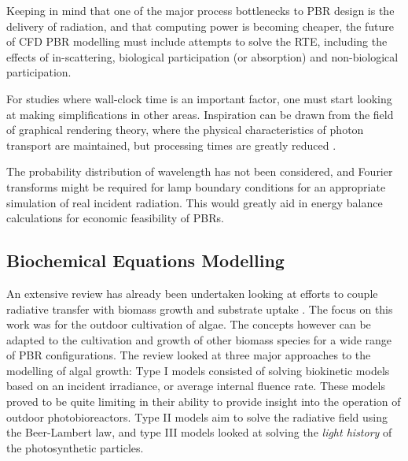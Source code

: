 Keeping in mind that one of the major process bottlenecks to PBR design is the delivery of radiation, and that computing power is becoming cheaper, the future of CFD PBR modelling must include attempts to solve the RTE, including the effects of in-scattering, biological participation (or absorption) and non-biological participation. 
\skippingparagraph

For studies where wall-clock time is an important factor, one must start looking at making simplifications in other areas. Inspiration can be drawn from the field of graphical rendering theory, where the physical characteristics of photon transport are maintained, but processing times are greatly reduced \cite{jarosz2008}.
\skippingparagraph

The probability distribution of wavelength has not been considered, and Fourier transforms might be required for lamp boundary conditions for an appropriate simulation of real incident radiation. This would greatly aid in energy balance calculations for economic feasibility of PBRs. 

\subsection{Biochemical Equations Modelling}
\label{S:3.3}
An extensive review has already been undertaken looking at efforts to couple radiative transfer with biomass growth and substrate uptake \cite{bechet2013}. The focus on this work was for the outdoor cultivation of algae. The concepts however can be adapted to the cultivation and growth of other biomass species for a wide range of PBR configurations. The review looked at three major approaches to the modelling of algal growth: Type I models consisted of solving biokinetic models based on an incident irradiance, or average internal fluence rate. These models proved to be quite limiting in their ability to provide insight into the operation of outdoor photobioreactors. Type II models aim to solve the radiative field using the Beer-Lambert law, and type III models looked at solving the \textit{light history} of the photosynthetic particles.

